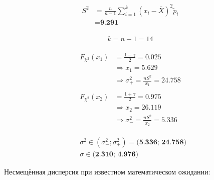 \documentclass[12pt, a4paper]{article}
\begin{document}
\begin{multicols}{2}
  \null \vfill
  \begin{align*}
    \begin{split}
      S^2 &= \frac{n}{n-1}\sum_{i=1}^{k}(x_i - \bar{X})^2\tilde{p}_i \\
          &= \textbf{9.291}
    \end{split}
  \end{align*}
  \vfill \null

  \columnbreak

  \begin{align*}
    k = n - 1 = 14
  \end{align*}

  \begin{align*}
    \begin{split}
      F_{\chi^2}(x_1) &= \frac{1 - \gamma}{2} = 0.025                         \\
                      & \Rightarrow x_1 = 5.629                               \\
                      & \Rightarrow \sigma_{+}^2 = \frac{nS^2}{x_1} = 24.758
    \end{split} \\[1ex]
    \begin{split}
      F_{\chi^2}(x_2) &= \frac{1 + \gamma}{2} = 0.975                         \\
                      & \Rightarrow x_2 = 26.119                              \\
                      & \Rightarrow \sigma_{-}^2 = \frac{nS^2}{x_2} = 5.336
    \end{split}
  \end{align*}

  \begin{align*}
    &\sigma^2 \in (\sigma_{-}^2; \sigma_{+}^2) = \textbf{(5.336; 24.758)} \\
    &\sigma \in \textbf{(2.310; 4.976)}
  \end{align*}
\end{multicols}

\noindent Несмещённая дисперсия при известном математическом ожидании:
\end{document}
